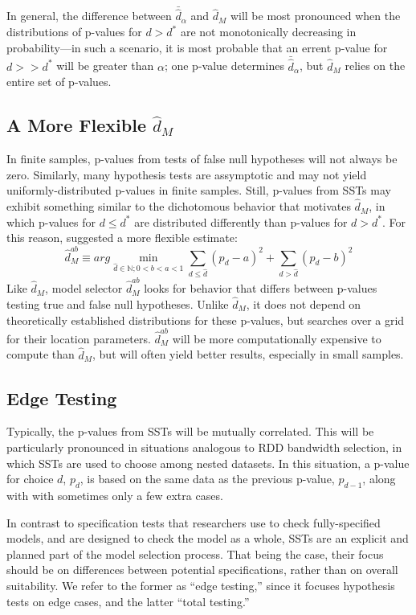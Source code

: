 \documentclass[12pt]{article}\usepackage[]{graphicx}\usepackage[]{color}
\newcommand{\dalphaU}{\bar{\hat{d}}_\alpha}
\newcommand{\dstar}{d^*}
\newcommand{\dhat}{\hat{d}}
\newcommand{\dhatm}{\hat{d}_M}
\newcommand{\dhatmab}{\hat{d}^{ab}_M}
\begin{document}
In general, the difference between $\dalphaU$ and $\dhatm$ will be
most pronounced when the distributions of p-values for $d>\dstar$ are
not monotonically decreasing in probability---in such a scenario, it
is most probable that an errent p-value for $d>>\dstar$ will be
greater than $\alpha$; one p-value determines $\dalphaU$, but
$\dhatm$ relies on the entire set of p-values.

\subsection{A More Flexible $\dhatm$}
In finite samples, p-values from tests of false null hypotheses will
not always be zero.
Similarly, many hypothesis tests are assymptotic and may not yield
uniformly-distributed p-values in finite samples.
Still, p-values from SSTs may exhibit something similar to the
dichotomous behavior that motivates $\dhatm$, in which p-values for
$d\le \dstar$ are distributed differently than p-values for
$d>\dstar$.
For this reason, \citet{mallik} suggested a more flexible estimate:
\begin{equation}
  \dhatmab \equiv arg\displaystyle\min_{\dhat\in \mathbb{N}; 0<b<a<1}
  \displaystyle\sum_{d\le \dhat} ( p_d
  -a)^2+\displaystyle\sum_{d>\dhat} (p_d-b)^2
\end{equation}
Like $\dhatm$, model selector $\dhatmab$ looks for behavior that
differs between p-values testing true and false null hypotheses.
Unlike $\dhatm$, it does not depend on theoretically established
distributions for these p-values, but searches over a grid for their
location parameters.
$\dhatmab$ will be more computationally expensive to compute than
$\dhatm$, but will often yield better results, especially in small
samples.

\subsection{Edge Testing}
Typically, the p-values from SSTs will be mutually correlated.
This will be particularly pronounced in situations analogous to RDD
bandwidth selection, in which SSTs are used to choose among nested
datasets.
In this situation, a p-value for choice $d$, $p_d$, is based on the
same data as the previous p-value, $p_{d-1}$, along with with sometimes only a
few extra cases.


In contrast to specification tests that researchers use to check
fully-specified models, and are designed to check the model as a
whole, SSTs are an explicit and planned part of the model selection
process.
That being the case, their focus should be on differences between
potential specifications, rather than on overall suitability.
We refer to the former as ``edge testing,'' since it focuses
hypothesis tests on edge cases, and the latter ``total testing.''
\end{document}
